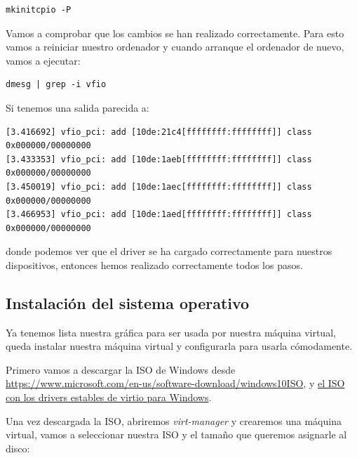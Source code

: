\documentclass[11pt]{article}
\begin{document}
\begin{verbatim}
mkinitcpio -P
\end{verbatim}

Vamos a comprobar que los cambios se han realizado correctamente. Para esto vamos a reiniciar nuestro ordenador y cuando arranque el ordenador de nuevo, vamos a ejecutar:

\begin{verbatim}
dmesg | grep -i vfio
\end{verbatim}

Si tenemos una salida parecida a:

\begin{lstlisting}[basicstyle=\small\ttfamily]
[3.416692] vfio_pci: add [10de:21c4[ffffffff:ffffffff]] class 0x000000/00000000
[3.433353] vfio_pci: add [10de:1aeb[ffffffff:ffffffff]] class 0x000000/00000000
[3.450019] vfio_pci: add [10de:1aec[ffffffff:ffffffff]] class 0x000000/00000000
[3.466953] vfio_pci: add [10de:1aed[ffffffff:ffffffff]] class 0x000000/00000000
\end{lstlisting}

donde podemos ver que el driver  se ha cargado correctamente para nuestros dispositivos, entonces hemos realizado correctamente todos los pasos.

\subsection{Instalación del sistema operativo}

Ya tenemos lista nuestra gráfica para ser usada por nuestra máquina virtual, queda instalar nuestra máquina virtual y configurarla para usarla cómodamente.

\vspace{5pt}

Primero vamos a descargar la ISO de Windows desde \href{https://www.microsoft.com/en-us/software-download/windows10ISO}{https://www.microsoft.com/en-us/software-download/windows10ISO}, y \href{https://github.com/virtio-win/virtio-win-pkg-scripts/blob/master/README.md}{el ISO con los drivers estables de virtio para Windows}.

\clearpage

Una vez descargada la ISO, abriremos \textit{virt-manager} y crearemos una máquina virtual, vamos a seleccionar nuestra ISO y el tamaño que queremos asignarle al disco:
\end{document}
